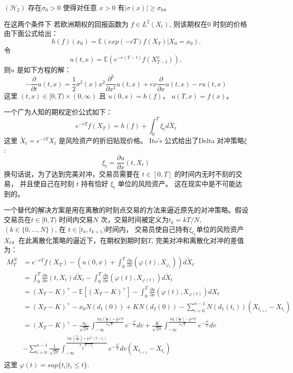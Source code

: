 $(\mathcal{H}_2)$ 存在$\sigma_0>0$ 使得对任意 $x>0$ 有$|\sigma(x)|\geq \sigma_0$。

在这两个条件下
若欧洲期权的回报函数为 $f\in L^2(X_t)$, 则该期权在$0$ 时刻的价格由下面公式给出：
\begin{equation}
h(f)(x_0)=\mathbb{E}(exp(-rT)f(X_T)|X_0=x_0).
\end{equation}
令
\begin{equation}
u(t, x)=\mathbb{E}(e^{-r(T-t)}f(X_{T-t}^x)),
\end{equation}
则$u$ 是如下方程的解：
\begin{equation}
-\frac{\partial}{\partial t}u(t, x) =\frac{1}{2}\sigma^2(x)x^2\frac{\partial^2}{\partial x^2}u(t,x)+rx\frac{\partial}{\partial x}u(t,x)-ru(t,x)
\end{equation}
这里 $(t,x)\in [0,T)\times (0,\infty)$ 且 $u(0,x)=h(f)$，  $u(T,x)=f(x)$。

一个广为人知的期权定价公式如下：
\begin{equation}
e^{-rT}f(X_T)=h(f)+\int_0^T \xi_t d\widetilde{X}_t
\end{equation}
这里 $\widetilde{X}_t=e^{-rT}X_t$ 是风险资产的折旧贴现价格。 
Ito's 公式给出了Delta 对冲策略$\xi$: 
\begin{equation}
\xi_t=\frac{\partial u}{\partial x}(t, X_t)
\end{equation}
换句话说，为了达到完美对冲，交易员需要在 
$t\in [0, T]$ 的时间内无时不刻的交易， 并且使自己在时刻 $t$ 持有恰好 $\xi_t$ 单位的风险资产。 
这在现实中是不可能达到的。

一个替代的解决方案是用在离散的时刻点交易的方法来逼近原先的对冲策略。假设交易员在$t\in[0, T)$
时间内交易$N$ 次，交易时间被定义为$t_k=kT/N$, $(k\in \{0,...,N\})$, 在 $t\in [t_k, t_{k+1})$时间内，
交易员使自己持有$\xi_{t_k}$单位的风险资产$X_t$。在此离散化策略的逼近下，在期权到期时刻$T$, 
完美对冲和离散化对冲的差值为：
\begin{equation}
\begin{split}
M_T^N
&=e^{-rT}f(X_T)-(u(0,x)+\int_0^T\frac{\partial u}{\partial x}(\varphi(t), 
X_{\varphi_t}))d\widetilde{X}_t\\
&=\int_0^T\frac{\partial u}{\partial x}(t, X_t)d\widetilde{X}_t-\int_0^T\frac{\partial u}{\partial x}(\varphi(t), X_{\varphi(t)})d\widetilde{X}_t\\
&=(X_T-K)^+-\mathbb{E}[(X_T-K)^+]-\int_0^T\frac{\partial u}{\partial x}(\varphi(t), X_{\varphi(t)})dX_t\\
&=(X_T-K)^+-x_0N(d_1(0))+KN(d_2(0))-\sum_{i=0}^{n-1}N(d_1(t_i))(X_{t_{i+1}}-X_{t_i})\\
&=(X_T-K)^+-\frac{x_0}{\sqrt{2\pi}}\int_{-\infty}^{\frac{\log(\frac{x_0}{K})+\frac{1}{2}\sigma^2T}
{\sigma\sqrt{T}}}e^{-\frac{v^2}{2}}dv+\frac{K}{\sqrt{2\pi}}\int_{-\infty}^{\frac{\log(\frac{x_0}{K})-\frac{1}{2}\sigma^2T}{\sigma\sqrt{T}}}e^{-\frac{v^2}{2}}dv\\
&-\sum_{i=0}^{n-1}\frac{1}{\sqrt{2\pi}}\int_{-\infty}^{\frac{\log(\frac{X_{t_i}}{K})+\frac{1}{2}\sigma^2(T-t_i)}{\sigma\sqrt{T-t_i}}}e^{-\frac{v^2}{2}}dv(X_{t_{i+1}}-X_{t_i})\\
\end{split}
\end{equation}
这里 $\varphi(t)=sup\{t_i | t_i\leq t \}$.

